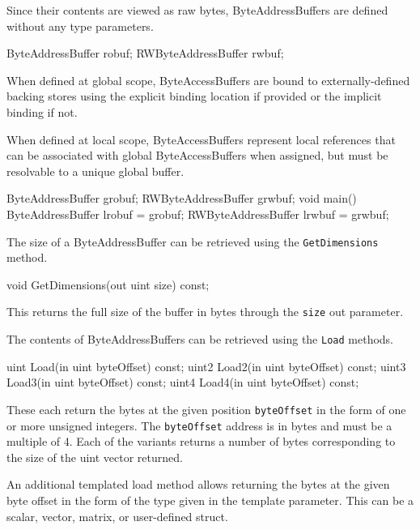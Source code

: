 
Since their contents are viewed as raw bytes, ByteAddressBuffers are defined without any type parameters.
\begin{HLSL}
  ByteAddressBuffer robuf;
  RWByteAddressBuffer rwbuf;
\end{HLSL}

When defined at global scope, ByteAccessBuffers are bound to externally-defined backing stores
using the explicit binding location if provided or the implicit binding if not.

When defined at local scope, ByteAccessBuffers represent local references
that can be associated with global ByteAccessBuffers when assigned,
but must be resolvable to a unique global buffer.

\begin{HLSL}
  ByteAddressBuffer grobuf;
  RWByteAddressBuffer grwbuf;
  void main() {
    ByteAddressBuffer lrobuf = grobuf;
    RWByteAddressBuffer lrwbuf = grwbuf;
  }
\end{HLSL}


The size of a ByteAddressBuffer can be retrieved using the \texttt{GetDimensions} method.
\begin{HLSL}
void GetDimensions(out uint size) const;
\end{HLSL}

This returns the full size of the buffer in bytes through the \texttt{size} out parameter.


The contents of ByteAddressBuffers can be retrieved using the \texttt{Load} methods.

\begin{HLSL}
 uint Load(in uint byteOffset) const;
 uint2 Load2(in uint byteOffset) const;
 uint3 Load3(in uint byteOffset) const;
 uint4 Load4(in uint byteOffset) const;
\end{HLSL}

These each return the bytes at the given position \texttt{byteOffset} in the form of one or more unsigned integers.
The \texttt{byteOffset} address is in bytes and must be a multiple of 4.
Each of the variants returns a number of bytes corresponding to the size of the uint vector returned.

An additional templated load method allows returning the bytes at the given byte offset in the form
of the type given in the template parameter. This can be a scalar, vector, matrix, or user-defined struct.

